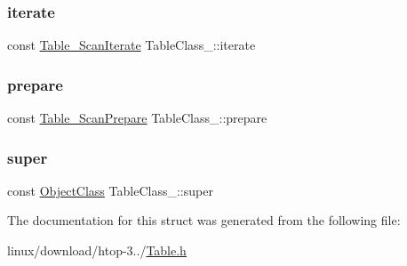 \subsubsection{\texorpdfstring{iterate}{iterate}}
{\footnotesize\ttfamily const \hyperlink{Table_8h_a148456aa8508b5f715555919f2b265f9}{Table\+\_\+\+Scan\+Iterate} Table\+Class\+\_\+\+::iterate}

\mbox{\label{structTableClass___aec75574c0e2335e9f2bd1a9519cd4d2f}} 
\subsubsection{\texorpdfstring{prepare}{prepare}}
{\footnotesize\ttfamily const \hyperlink{Table_8h_a9b73c1e2f5fe404379cbd9c2b2e54a0d}{Table\+\_\+\+Scan\+Prepare} Table\+Class\+\_\+\+::prepare}

\mbox{\label{structTableClass___af28d4c718da3df18b65169687696fa41}} 
\subsubsection{\texorpdfstring{super}{super}}
{\footnotesize\ttfamily const \hyperlink{Object_8h_a6feb151c3b8f61fae503dfbcdc3d6a54}{Object\+Class} Table\+Class\+\_\+\+::super}



The documentation for this struct was generated from the following file\+:\begin{DoxyCompactItemize}
\item 
linux/download/htop-\/3../\hyperlink{Table_8h}{Table.\+h}\end{DoxyCompactItemize}
